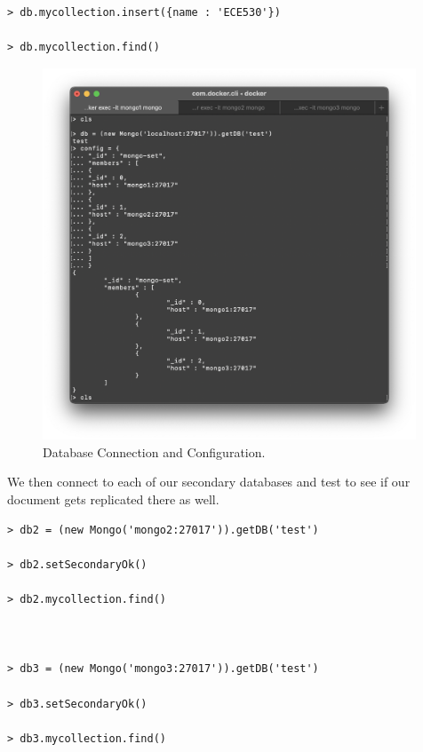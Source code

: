 \documentclass{article}
\begin{document}
\begin{tcolorbox}[colback=CrispBlue!5!white,colframe=CrispBlue!75!black,title=Write data to \texttt{mongo1} -- our primary DB and then read it]
\begin{verbatim}
> db.mycollection.insert({name : 'ECE530'})

> db.mycollection.find()
\end{verbatim}
\end{tcolorbox}


\begin{figure}[h!]
    \centering
    \includegraphics[width=0.99\textwidth]{Docker-DB.png}
    \vspace{-3em}\caption{Database Connection and Configuration.}
    \label{fig:Docker-DB}
\end{figure}

\newpage
We then connect to each of our secondary databases and test to see if our document gets replicated there as well.

\begin{tcolorbox}[colback=CrispBlue!5!white,colframe=CrispBlue!75!black,title=Test that data is being replicated to \texttt{mongo2} and \texttt{mongo3} respectively]
\begin{verbatim}
> db2 = (new Mongo('mongo2:27017')).getDB('test')

> db2.setSecondaryOk()

> db2.mycollection.find()



> db3 = (new Mongo('mongo3:27017')).getDB('test')

> db3.setSecondaryOk()

> db3.mycollection.find()
\end{verbatim}
\end{tcolorbox}
\end{document}
